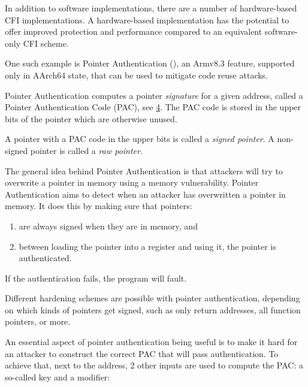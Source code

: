 \documentclass[
  a4paper,
]{report}
\providecommand{\tightlist}{%
  \setlength{\itemsep}{0pt}\setlength{\parskip}{0pt}}
\begin{document}
In addition to software implementations, there are a number of
hardware-based CFI implementations. A hardware-based implementation has
the potential to offer improved protection and performance compared to
an equivalent software-only CFI scheme.

One such example is \label{__index_entry_48}{Pointer
Authentication}
(), an Armv8.3 feature,
supported only in AArch64 state, that can be used to mitigate code reuse
attacks.

Pointer Authentication computes a pointer \emph{signature} for a given
address, called a \label{__index_entry_49}{Pointer
Authentication Code (PAC)}, see
\hyperref[fig:pauth-sign-auth]{4}. The PAC code is stored in the upper
bits of the pointer which are otherwise unused.

A pointer with a PAC code in the upper bits is called a
\emph{\label{__index_entry_50}{signed
pointer}}. A non-signed pointer is called a
\emph{\label{__index_entry_51}{raw
pointer}}.

The general idea behind Pointer Authentication is that attackers will
try to overwrite a pointer in memory using a memory vulnerability.
Pointer Authentication aims to detect when an attacker has overwritten a
pointer in memory. It does this by making sure that pointers:

\begin{enumerate}
\def\labelenumi{\arabic{enumi}.}
\tightlist
\item
  are always signed when they are in memory, and
\item
  between loading the pointer into a register and using it, the pointer
  is authenticated.
\end{enumerate}

If the authentication fails, the program will fault.

Different hardening schemes are possible with pointer authentication,
depending on which kinds of pointers get signed, such as only return
addresses, all function pointers, or more.

An essential aspect of pointer authentication being useful is to make it
hard for an attacker to construct the correct PAC that will pass
authentication. To achieve that, next to the address, 2 other inputs are
used to compute the PAC: a so-called
\label{__index_entry_52}{key} and a
\label{__index_entry_53}{modifier}:
\end{document}
